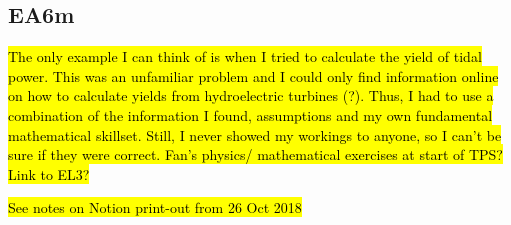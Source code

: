 \subsection*{EA6m}

\hl{The only example I can think of is when I tried to calculate the yield of tidal power. This was an unfamiliar problem and I could only find information online on how to calculate yields from hydroelectric turbines (?). Thus, I had to use a combination of the information I found, assumptions and my own fundamental mathematical skillset. Still, I never showed my workings to anyone, so I can't be sure if they were correct. Fan's physics/ mathematical exercises at start of TPS? Link to EL3?}

\hl{See notes on Notion print-out from 26 Oct 2018}


